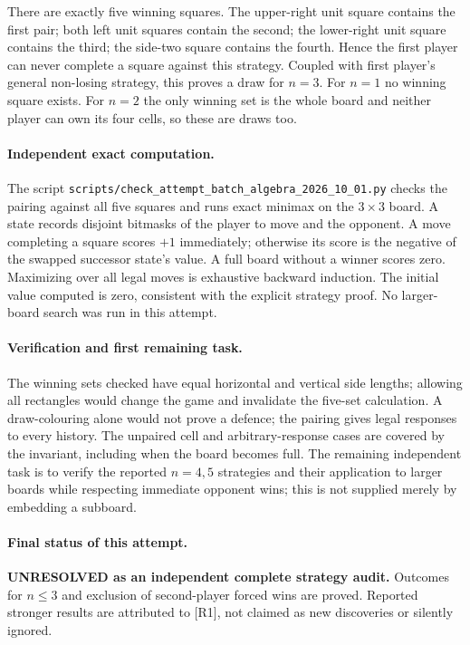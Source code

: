 \documentclass[11pt,a4paper]{article}
\begin{document}
There are exactly five winning squares. The upper-right unit square
contains the first pair; both left unit squares contain the second;
the lower-right unit square contains the third; the side-two square
contains the fourth. Hence the first player can never complete a
square against this strategy. Coupled with first player's general
non-losing strategy, this proves a draw for $n=3$. For $n=1$ no
winning square exists. For $n=2$ the only winning set is the whole
board and neither player can own its four cells, so these are draws too.

\paragraph{Independent exact computation.}
The script
\texttt{scripts/check\_attempt\_batch\_algebra\_2026\_10\_01.py}
checks the pairing against all five squares and runs exact minimax
on the $3\times3$ board. A state records disjoint bitmasks of the
player to move and the opponent. A move completing a square scores
$+1$ immediately; otherwise its score is the negative of the
swapped successor state's value. A full board without a winner
scores zero. Maximizing over all legal moves is exhaustive backward
induction. The initial value computed is zero, consistent with the
explicit strategy proof. No larger-board search was run in this attempt.

\paragraph{Verification and first remaining task.}
The winning sets checked have equal horizontal and vertical side
lengths; allowing all rectangles would change the game and invalidate
the five-set calculation. A draw-colouring alone would not prove
a defence; the pairing gives legal responses to every history.
The unpaired cell and arbitrary-response cases are covered by the
invariant, including when the board becomes full. The remaining
independent task is to verify the reported $n=4,5$ strategies and
their application to larger boards while respecting immediate
opponent wins; this is not supplied merely by embedding a subboard.

\paragraph{Final status of this attempt.}
\textbf{UNRESOLVED as an independent complete strategy audit.}
Outcomes for $n\le3$ and exclusion of second-player forced wins
are proved. Reported stronger results are attributed to [R1], not
claimed as new discoveries or silently ignored.
\end{document}
